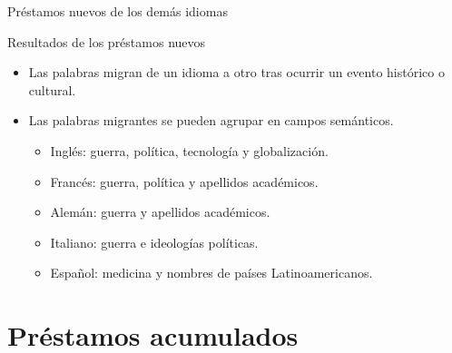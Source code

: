\documentclass[10pt,xcolor={usenames,dvipsnames}]{beamer}
\begin{document}
\begin{frame}{Préstamos nuevos de los demás idiomas}
\vspace{5mm}
\end{frame}

\begin{frame}[fragile]{Resultados de los préstamos nuevos}
	\begin{itemize}
		\item<1->[$\blacksquare$]\large{Las palabras migran de un idioma a otro tras ocurrir un evento histórico o cultural.}\\
		
		\item<2>[$\blacksquare$]\large{Las palabras migrantes se pueden agrupar en campos semánticos.} 
		
		\begin{itemize}
			\item Inglés: guerra, política, tecnología y globalización.
			\item Francés: guerra, política y apellidos académicos.
			\item Alemán: guerra y apellidos académicos.
			\item Italiano: guerra e ideologías políticas.
			\item Español: medicina y nombres de países Latinoamericanos. 
		
		\end{itemize}
	\end{itemize}
\end{frame}


\section{Préstamos acumulados}
\end{document}

